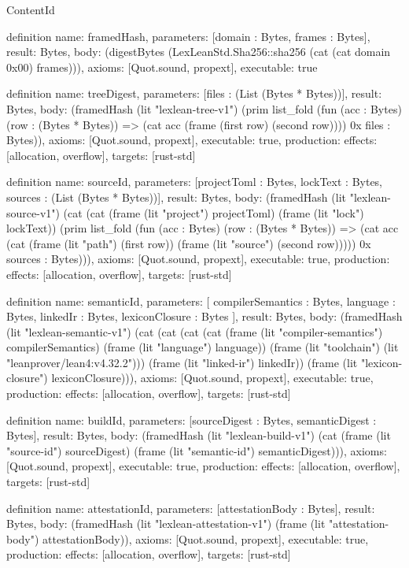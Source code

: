 \begin{lexlean}{ContentId}
\begin{semanticmodule}
definition{
  name: framedHash,
  parameters: [domain : Bytes, frames : Bytes],
  result: Bytes,
  body: (digestBytes (LexLeanStd.Sha256::sha256 (cat (cat domain 0x00) frames))),
  axioms: [Quot.sound, propext],
  executable: true
}

definition{
  name: treeDigest,
  parameters: [files : (List (Bytes * Bytes))],
  result: Bytes,
  body: (framedHash (lit "lexlean-tree-v1") (prim list_fold (fun (acc : Bytes) (row : (Bytes * Bytes)) => (cat acc (frame (first row) (second row)))) 0x files : Bytes)),
  axioms: [Quot.sound, propext],
  executable: true,
  production: {effects: [allocation, overflow], targets: [rust-std]}
}

definition{
  name: sourceId,
  parameters: [projectToml : Bytes, lockText : Bytes, sources : (List (Bytes * Bytes))],
  result: Bytes,
  body: (framedHash (lit "lexlean-source-v1") (cat (cat (frame (lit "project") projectToml) (frame (lit "lock") lockText)) (prim list_fold (fun (acc : Bytes) (row : (Bytes * Bytes)) => (cat acc (cat (frame (lit "path") (first row)) (frame (lit "source") (second row))))) 0x sources : Bytes))),
  axioms: [Quot.sound, propext],
  executable: true,
  production: {effects: [allocation, overflow], targets: [rust-std]}
}

definition{
  name: semanticId,
  parameters: [
    compilerSemantics : Bytes,
    language : Bytes,
    linkedIr : Bytes,
    lexiconClosure : Bytes
  ],
  result: Bytes,
  body: (framedHash (lit "lexlean-semantic-v1") (cat (cat (cat (cat (frame (lit "compiler-semantics") compilerSemantics) (frame (lit "language") language)) (frame (lit "toolchain") (lit "leanprover/lean4:v4.32.2"))) (frame (lit "linked-ir") linkedIr)) (frame (lit "lexicon-closure") lexiconClosure))),
  axioms: [Quot.sound, propext],
  executable: true,
  production: {effects: [allocation, overflow], targets: [rust-std]}
}

definition{
  name: buildId,
  parameters: [sourceDigest : Bytes, semanticDigest : Bytes],
  result: Bytes,
  body: (framedHash (lit "lexlean-build-v1") (cat (frame (lit "source-id") sourceDigest) (frame (lit "semantic-id") semanticDigest))),
  axioms: [Quot.sound, propext],
  executable: true,
  production: {effects: [allocation, overflow], targets: [rust-std]}
}

definition{
  name: attestationId,
  parameters: [attestationBody : Bytes],
  result: Bytes,
  body: (framedHash (lit "lexlean-attestation-v1") (frame (lit "attestation-body") attestationBody)),
  axioms: [Quot.sound, propext],
  executable: true,
  production: {effects: [allocation, overflow], targets: [rust-std]}
}


\end{semanticmodule}
\end{lexlean}
